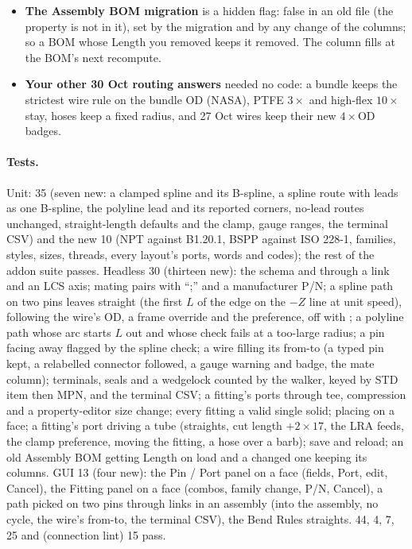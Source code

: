 \begin{itemize}[nosep]
        render, fixed in ).
  \item \textbf{The Assembly BOM migration} is a hidden  flag: false in an old file (the
        property is not in it), set by the migration and by any change of the columns; so a BOM whose Length you
        removed keeps it removed. The column fills at the BOM's next recompute.
  \item \textbf{Your other 30 Oct routing answers} needed no code: a bundle keeps the strictest wire rule on the
        bundle OD (NASA), PTFE $3\times$ and high-flex $10\times$ stay, hoses keep a fixed radius, and 27 Oct wires
        keep their new $4\times$OD badges.
\end{itemize}

\paragraph{Tests.} Unit:  35 (seven new: a clamped spline and its B-spline, a spline route
with leads as one B-spline, the polyline lead and its reported corners, no-lead routes unchanged, straight-length
defaults and the clamp, gauge ranges, the terminal CSV) and the new  10 (NPT against
B1.20.1, BSPP against ISO 228-1, families, styles, sizes, threads, every layout's ports, words and codes); the
rest of the addon suite passes. Headless  30 (thirteen new): the schema and
 through a link and an LCS axis; mating pairs with ``;'' and a manufacturer P/N; a spline path on two
pins leaves straight (the first $L$ of the edge on the $-Z$ line at unit speed), following the wire's OD, a frame
override and the preference, off with ; a polyline path whose arc starts $L$ out and whose
check fails at a too-large radius; a pin facing away flagged by the spline check; a wire filling its from-to (a typed
pin kept, a relabelled connector followed, a gauge warning and badge, the mate column); terminals, seals and a
wedgelock counted by the walker, keyed by STD item then MPN, and the terminal CSV; a fitting's ports through tee,
compression and a property-editor size change; every fitting a valid single solid; placing on a face; a fitting's
port driving a tube (straights, cut length $+2\times17$, the LRA feeds, the clamp preference, moving the fitting, a
hose over a barb); save and reload; an old Assembly BOM getting Length on load and a changed one keeping its
columns. GUI  13 (four new): the Pin / Port panel on a face (fields, Port, edit,
Cancel), the Fitting panel on a face (combos, family change, P/N, Cancel), a path picked on two pins through links
in an assembly (into the assembly, no cycle, the wire's from-to, the terminal CSV), the Bend Rules straights.
 44,  4,  7,
 25 and  (connection lint) 15 pass.


